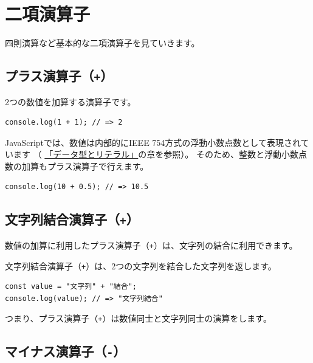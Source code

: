 \hypertarget{binary-operator}{%
\section{二項演算子}\label{binary-operator}}

四則演算など基本的な二項演算子を見ていきます。

\hypertarget{plus-operator}{%
\subsection{\texorpdfstring{プラス演算子（\texttt{+}）}{プラス演算子（+）}}\label{plus-operator}}

2つの数値を加算する演算子です。

\begin{lstlisting}
console.log(1 + 1); // => 2
\end{lstlisting}

JavaScriptでは、数値は内部的にIEEE
754方式の浮動小数点数として表現されています （
\hyperlink{data-type-and-literal}{「データ型とリテラル」}の章を参照）。
そのため、整数と浮動小数点数の加算もプラス演算子で行えます。

\begin{lstlisting}
console.log(10 + 0.5); // => 10.5
\end{lstlisting}

\hypertarget{string-combination-operator}{%
\subsection{\texorpdfstring{文字列結合演算子（\texttt{+}）}{文字列結合演算子（+）}}\label{string-combination-operator}}

数値の加算に利用したプラス演算子（\texttt{+}）は、文字列の結合に利用できます。

文字列結合演算子（\texttt{+}）は、2つの文字列を結合した文字列を返します。

\begin{lstlisting}
const value = "文字列" + "結合";
console.log(value); // => "文字列結合"
\end{lstlisting}

つまり、プラス演算子（\texttt{+}）は数値同士と文字列同士の演算をします。

\hypertarget{minus-operator}{%
\subsection{\texorpdfstring{マイナス演算子（\texttt{-}）}{マイナス演算子（-）}}\label{minus-operator}}


